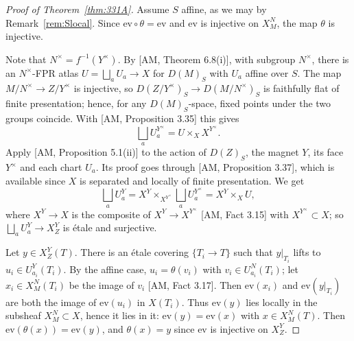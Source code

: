 \begin{proof}[Proof of Theorem~\ref{thm:331A}]
Assume $S$ affine, as we may by Remark~\ref{rem:Slocal}. Since $\mathrm{ev}\circ\theta=\mathrm{ev}$ and $\mathrm{ev}$ is injective on $X^{N}_{M}$, the map $\theta$ is injective.

Note that $N^{\times}=f^{-1}(Y^{\times})$. By [AM, Theorem 6.8(i)], with subgroup $N^{\times}$, there is an $N^{\times}$-FPR atlas $U=\bigsqcup_a U_a\to X$ for $D(M)_S$ with $U_a$ affine over $S$. The map $M/N^{\times}\to Z/Y^{\times}$ is injective, so $D(Z/Y^{\times})_S\to D(M/N^{\times})_S$ is faithfully flat of finite presentation; hence, for any $D(M)_S$-space, fixed points under the two groups coincide. With [AM, Proposition 3.35] this gives
\[
\bigsqcup_a U_a^{Y^{\times}}=U\times_X X^{Y^{\times}}.
\]
Apply [AM, Proposition 5.1(ii)] to the action of $D(Z)_S$, the magnet $Y$, its face $Y^{\times}$ and each chart $U_a$. Its proof goes through [AM, Proposition 3.37], which is available since $X$ is separated and locally of finite presentation. We get
\[
\bigsqcup_a U_a^{Y}=X^{Y}\times_{X^{Y^{\times}}}\bigsqcup_a U_a^{Y^{\times}}=X^{Y}\times_X U,
\]
where $X^{Y}\to X$ is the composite of $X^{Y}\to X^{Y^{\times}}$ [AM, Fact 3.15] with $X^{Y^{\times}}\subset X$; so $\bigsqcup_a U_a^{Y}\to X^{Y}_{Z}$ is étale and surjective.

Let $y\in X^{Y}_{Z}(T)$. There is an étale covering $\{T_i\to T\}$ such that $y|_{T_i}$ lifts to $u_i\in U_{a_i}^{Y}(T_i)$. By the affine case, $u_i=\theta(v_i)$ with $v_i\in U_{a_i}^{N}(T_i)$; let $x_i\in X^{N}_{M}(T_i)$ be the image of $v_i$ [AM, Fact 3.17]. Then $\mathrm{ev}(x_i)$ and $\mathrm{ev}(y|_{T_i})$ are both the image of $\mathrm{ev}(u_i)$ in $X(T_i)$. Thus $\mathrm{ev}(y)$ lies locally in the subsheaf $X^{N}_{M}\subset X$, hence it lies in it: $\mathrm{ev}(y)=\mathrm{ev}(x)$ with $x\in X^{N}_{M}(T)$. Then $\mathrm{ev}(\theta(x))=\mathrm{ev}(y)$, and $\theta(x)=y$ since $\mathrm{ev}$ is injective on $X^{Y}_{Z}$.
\end{proof}

